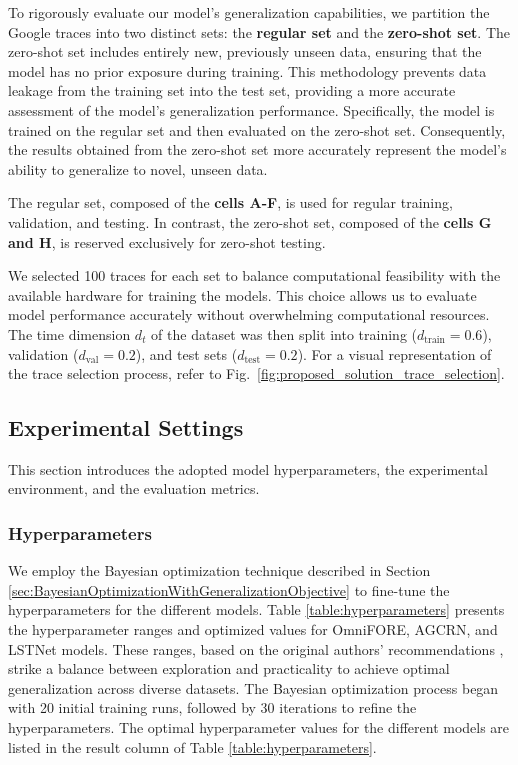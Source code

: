 To rigorously evaluate our model's generalization capabilities, we partition the Google traces into two distinct sets: the \textbf{regular set} and the \textbf{zero-shot set}. The zero-shot set includes entirely new, previously unseen data, ensuring that the model has no prior exposure during training. This methodology prevents data leakage from the training set into the test set, providing a more accurate assessment of the model's generalization performance. Specifically, the model is trained on the regular set and then evaluated on the zero-shot set. Consequently, the results obtained from the zero-shot set more accurately represent the model's ability to generalize to novel, unseen data.

The regular set, composed of the \textbf{cells A-F}, is used for regular training, validation, and testing. In contrast, the zero-shot set, composed of the \textbf{cells G and H}, is reserved exclusively for zero-shot testing.

We selected 100 traces for each set to balance computational feasibility with the available hardware for training the models. This choice allows us to evaluate model performance accurately without overwhelming computational resources. The time dimension $d_t$ of the dataset was then split into training ($d_\text{train} = 0.6$), validation ($d_\text{val} = 0.2$), and test sets ($d_\text{test} = 0.2$). For a visual representation of the trace selection process, refer to Fig.~\ref{fig:proposed_solution_trace_selection}.

\subsection{Experimental Settings}
This section introduces the adopted model hyperparameters, the experimental environment, and the evaluation metrics.

\subsubsection{\textbf{Hyperparameters}}
We employ the Bayesian optimization technique described in Section \ref{sec:BayesianOptimizationWithGeneralizationObjective} to fine-tune the hyperparameters for the different models. Table \ref{table:hyperparameters} presents the hyperparameter ranges and optimized values for OmniFORE, AGCRN, and LSTNet models. These ranges, based on the original authors' recommendations \cite{AGCRN, LSTNet}, strike a balance between exploration and practicality to achieve optimal generalization across diverse datasets. The Bayesian optimization process began with 20 initial training runs, followed by 30 iterations to refine the hyperparameters. The optimal hyperparameter values for the different models are listed in the result column of Table \ref{table:hyperparameters}.

